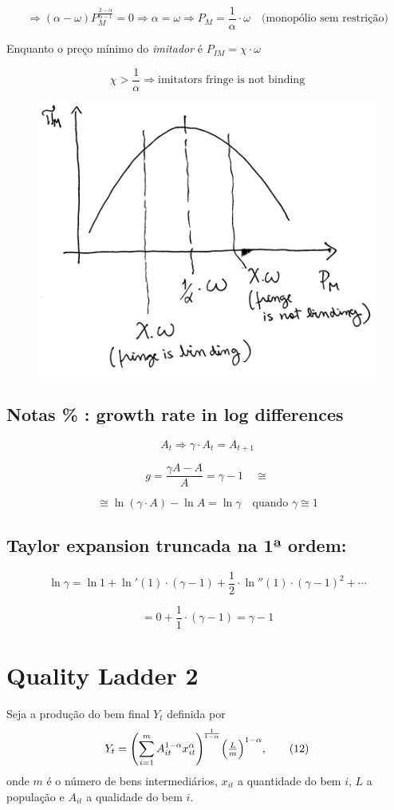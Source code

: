 \documentclass[a4paper,12pt]{article}[abntex2]
\begin{document}
\[
\Rightarrow \left( \alpha - \omega \right) P_M^{\frac{2 - \alpha}{\alpha - 1}} = 0
\Rightarrow \alpha = \omega
\Rightarrow P_M = \frac{1}{\alpha} \cdot \omega \quad \text{(monopólio sem restrição)}
\]

Enquanto o preço mínimo do \textit{imitador} é \(P_{IM} = \chi \cdot \omega\)

\[
\chi > \frac{1}{\alpha}
\Rightarrow \text{imitators fringe is not binding}
\]

\begin{figure}[H]
    \centering
    \includegraphics[width=0.7\linewidth]{Imagens/a18i1.png}
\end{figure}

\subsection{\textbf{Notas \% : growth rate in log differences}}

\[
A_t \Rightarrow \gamma \cdot A_t = A_{t+1}
\]

\[
g = \frac{\gamma A - A}{A} = \gamma - 1 \quad \cong
\]

\[
\cong \ln(\gamma \cdot A) - \ln A = \ln \gamma \quad \text{quando } \gamma \cong 1
\]

\subsection{\textbf{Taylor expansion truncada na 1ª ordem:}}

\[
\ln \gamma = \ln 1 + \ln'(1) \cdot (\gamma - 1)
+ \frac{1}{2} \cdot \ln''(1) \cdot (\gamma - 1)^2 + \cdots
\]

\[
= 0 + \frac{1}{1} \cdot (\gamma - 1) = \gamma - 1
\]

\newpage
\section{\textbf{Quality Ladder 2}}
Seja a produção do bem final \(Y_t\) definida por
\[
  Y_t = \Biggl( \sum_{i=1}^m A_{it}^{1-\alpha} x_{it}^{\alpha} \Biggr)^{\!\frac{1}{1-\alpha}}
        \Bigl(\tfrac{L}{m}\Bigr)^{1-\alpha}, \tag{12}
\]
onde \(m\) é o número de bens intermediários, \(x_{it}\) a quantidade do bem \(i\),
\(L\) a população e \(A_{it}\) a qualidade do bem \(i\).
\end{document}
